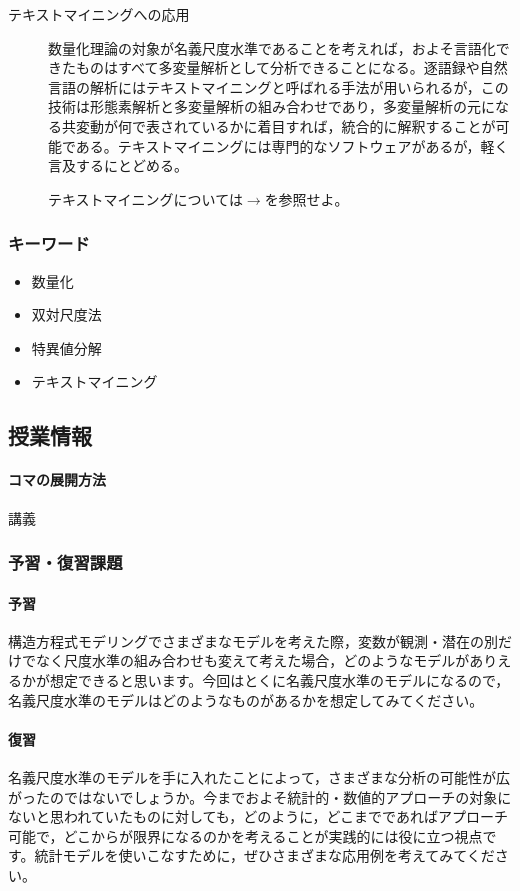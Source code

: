 \begin{description}
	\item[テキストマイニングへの応用] 数量化理論の対象が名義尺度水準であることを考えれば，およそ言語化できたものはすべて多変量解析として分析できることになる。逐語録や自然言語の解析にはテキストマイニングと呼ばれる手法が用いられるが，この技術は形態素解析と多変量解析の組み合わせであり，多変量解析の元になる共変動が何で表されているかに着目すれば，統合的に解釈することが可能である。テキストマイニングには専門的なソフトウェアがあるが，軽く言及するにとどめる。
	      \begin{flushright}
		      テキストマイニングについては$\to$\textcite{Higuchu20200406}を参照せよ。
	      \end{flushright}

\end{description}
\subsubsection{キーワード}
\begin{itemize}
	\item 数量化
	\item 双対尺度法
	\item 特異値分解
	\item テキストマイニング
\end{itemize}
\subsection{授業情報}
\paragraph{コマの展開方法}
講義
\subsubsection{予習・復習課題}
\paragraph{予習} 構造方程式モデリングでさまざまなモデルを考えた際，変数が観測・潜在の別だけでなく尺度水準の組み合わせも変えて考えた場合，どのようなモデルがありえるかが想定できると思います。今回はとくに名義尺度水準のモデルになるので，名義尺度水準のモデルはどのようなものがあるかを想定してみてください。
\paragraph{復習} 名義尺度水準のモデルを手に入れたことによって，さまざまな分析の可能性が広がったのではないでしょうか。今までおよそ統計的・数値的アプローチの対象にないと思われていたものに対しても，どのように，どこまでであればアプローチ可能で，どこからが限界になるのかを考えることが実践的には役に立つ視点です。統計モデルを使いこなすために，ぜひさまざまな応用例を考えてみてください。